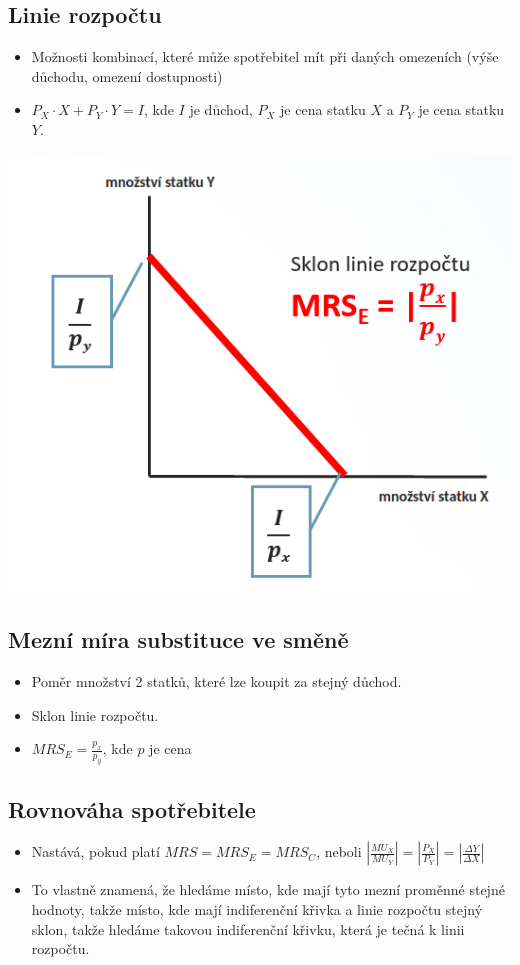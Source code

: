 \subsection{Linie rozpočtu}
\begin{itemize}
    \item Možnosti kombinací, které může spotřebitel mít při daných omezeních (výše důchodu, omezení dostupnosti)
    \item $P_X \cdot X+P_Y \cdot Y = I$, kde $I$ je důchod, $P_X$ je cena statku $X$
    a $P_Y$ je cena statku $Y$.
\end{itemize}
\includegraphics[width=16cm]{images/06_pr_spotr_m.png}

\subsection{Mezní míra substituce ve směně}
\begin{itemize}
    \item Poměr množství 2 statků, které lze koupit za stejný důchod.
    \item Sklon linie rozpočtu.
    \item $MRS_E=\frac{p_x}{p_y}$, kde $p$ je cena
\end{itemize}

\subsection{Rovnováha spotřebitele}
\begin{itemize}
    \item Nastává, pokud platí $MRS=MRS_E=MRS_C$, neboli $|\frac{MU_X}{MU_Y}|=|\frac{P_X}{P_Y}|=|\frac{\Delta Y}{\Delta X}|$
    \item To vlastně znamená, že hledáme místo, kde mají tyto mezní proměnné stejné hodnoty, takže místo, kde mají indiferenční křivka a linie rozpočtu stejný sklon, takže hledáme takovou indiferenční křivku, která je tečná k linii rozpočtu.
\end{itemize}


